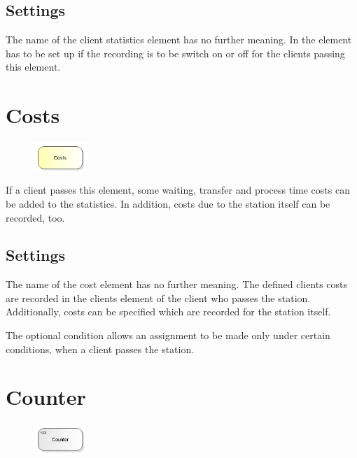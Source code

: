 \subsection*{Settings}

The name of the client statistics element has no further meaning.
In the element has to be set up if the recording is to be switch on or off
for the clients passing this element.


\section{Costs}
\label{ref:ModelElementCosts}

\begin{figure}
\vspace{-22pt}
\includegraphics[width=2cm]{imageModelElementCosts.png}
\vspace{-22pt}
\end{figure}

If a client passes this element, some waiting, transfer and process time costs can be added to the
statistics. In addition, costs due to the station itself can be recorded, too.

\subsection*{Settings}

The name of the cost element has no further meaning. The defined clients costs are recorded in the clients element
of the client who passes the station. Additionally, costs can be specified which are recorded for the station itself.

The optional condition allows an assignment to be made only under certain conditions,
when a client passes the station.


\section{Counter}
\label{ref:ModelElementCounter}

\begin{figure}
\vspace{-22pt}
\includegraphics[width=2cm]{imageModelElementCounter.png}
\vspace{-22pt}
\end{figure}

